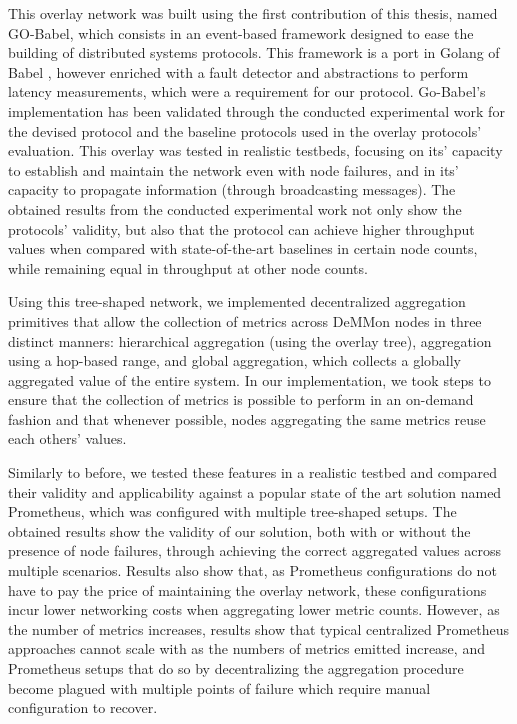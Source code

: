 This overlay network was built using the first contribution of this thesis, named GO-Babel, which consists in an event-based framework designed to ease the building of distributed systems protocols. This framework is a port in Golang of Babel \cite{babel}, however enriched with a fault detector and abstractions to perform latency measurements, which were a requirement for our protocol. Go-Babel's implementation has been validated through the conducted experimental work for the devised protocol and the baseline protocols used in the overlay protocols' evaluation. This overlay was tested in realistic testbeds, focusing on its’ capacity to establish and maintain the network even with node failures, and in its' capacity to propagate information (through broadcasting messages). The obtained results from the conducted experimental work not only show the protocols' validity, but also that the protocol can achieve higher throughput values when compared with state-of-the-art baselines in certain node counts, while remaining equal in throughput at other node counts.

Using this tree-shaped network, we implemented decentralized aggregation primitives that allow the collection of metrics across DeMMon nodes in three distinct manners: hierarchical aggregation (using the overlay tree), aggregation using a hop-based range, and global aggregation, which collects a globally aggregated value of the entire system. In our implementation, we took steps to ensure that the collection of metrics is possible to perform in an on-demand fashion and that whenever possible, nodes aggregating the same metrics reuse each others' values.

Similarly to before, we tested these features in a realistic testbed and compared their validity and applicability against a popular state of the art solution named Prometheus, which was configured with multiple tree-shaped setups. The obtained results show the validity of our solution, both with or without the presence of node failures, through achieving the correct aggregated values across multiple scenarios. Results also show that, as Prometheus configurations do not have to pay the price of maintaining the overlay network, these configurations incur lower networking costs when aggregating lower metric counts. However, as the number of metrics increases, results show that typical centralized Prometheus approaches cannot scale with as the numbers of metrics emitted increase, and Prometheus setups that do so by decentralizing the aggregation procedure become plagued with multiple points of failure which require manual configuration to recover. 

